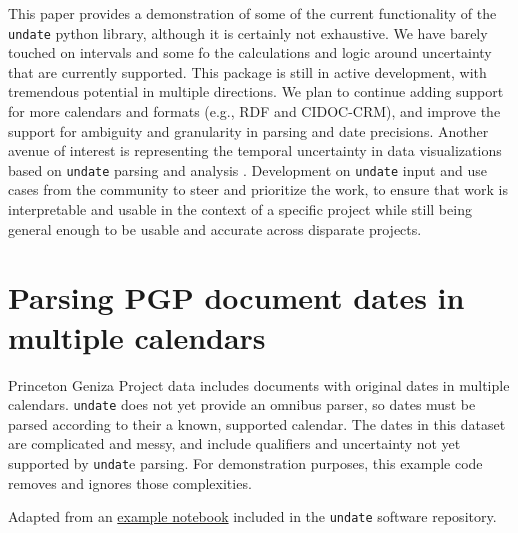 \documentclass{anthology-ch}         %
\begin{document}
This paper provides a demonstration of some of the current functionality of the \texttt{undate} python library, although it is certainly not exhaustive. We have barely touched on intervals and some fo the calculations and logic around uncertainty that are currently supported. This package is still in active development, with tremendous potential in multiple directions. We plan to continue adding support for more calendars and formats (e.g., RDF and CIDOC-CRM), and improve the support for ambiguity and granularity in parsing and date precisions.  Another avenue of interest is representing the temporal uncertainty in data visualizations based on \texttt{undate} parsing and analysis \cite{yau_visualizing_2018}. Development on \texttt{undate} input and use cases from the community to steer and prioritize the work, to ensure that work is interpretable and usable in the context of a specific project while still being general enough to be usable and accurate across disparate projects. 



%

\printbibliography

\appendix

\section{Parsing PGP document dates in multiple calendars} \label{appdx:parse-pgp-dates}

Princeton Geniza Project data includes documents with original dates in multiple calendars.  \texttt{undate} does not yet provide an omnibus parser, so dates must be parsed according to their a known, supported calendar.  The dates in this dataset are complicated and messy, and include qualifiers and uncertainty not yet supported by \texttt{undat}e parsing. For demonstration purposes, this example code removes and ignores those complexities.

Adapted from an \href{https://github.com/dh-tech/undate-python/blob/main/examples/pgp_dates.ipynb}{example notebook} included in the \texttt{undate} software repository.
\end{document}
